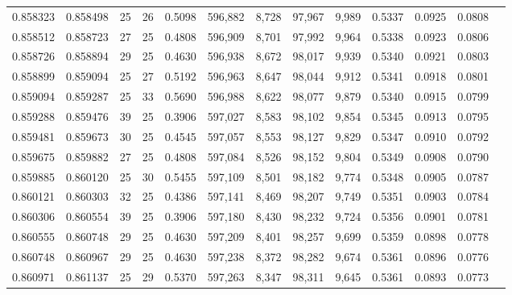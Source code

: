 \begin{tabular}{rrrrrrrrrrrrr}
0.858323 & 0.858498 &    25 &  26 &                                     0.5098 & 596,882 &   8,728 &  97,967 &   9,989 & 0.5337 & 0.0925 & 0.0808 \\
0.858512 & 0.858723 &    27 &  25 &                                     0.4808 & 596,909 &   8,701 &  97,992 &   9,964 & 0.5338 & 0.0923 & 0.0806 \\
0.858726 & 0.858894 &    29 &  25 &                                     0.4630 & 596,938 &   8,672 &  98,017 &   9,939 & 0.5340 & 0.0921 & 0.0803 \\
0.858899 & 0.859094 &    25 &  27 &                                     0.5192 & 596,963 &   8,647 &  98,044 &   9,912 & 0.5341 & 0.0918 & 0.0801 \\
0.859094 & 0.859287 &    25 &  33 &                                     0.5690 & 596,988 &   8,622 &  98,077 &   9,879 & 0.5340 & 0.0915 & 0.0799 \\
0.859288 & 0.859476 &    39 &  25 &                                     0.3906 & 597,027 &   8,583 &  98,102 &   9,854 & 0.5345 & 0.0913 & 0.0795 \\
0.859481 & 0.859673 &    30 &  25 &                                     0.4545 & 597,057 &   8,553 &  98,127 &   9,829 & 0.5347 & 0.0910 & 0.0792 \\
0.859675 & 0.859882 &    27 &  25 &                                     0.4808 & 597,084 &   8,526 &  98,152 &   9,804 & 0.5349 & 0.0908 & 0.0790 \\
0.859885 & 0.860120 &    25 &  30 &                                     0.5455 & 597,109 &   8,501 &  98,182 &   9,774 & 0.5348 & 0.0905 & 0.0787 \\
0.860121 & 0.860303 &    32 &  25 &                                     0.4386 & 597,141 &   8,469 &  98,207 &   9,749 & 0.5351 & 0.0903 & 0.0784 \\
0.860306 & 0.860554 &    39 &  25 &                                     0.3906 & 597,180 &   8,430 &  98,232 &   9,724 & 0.5356 & 0.0901 & 0.0781 \\
0.860555 & 0.860748 &    29 &  25 &                                     0.4630 & 597,209 &   8,401 &  98,257 &   9,699 & 0.5359 & 0.0898 & 0.0778 \\
0.860748 & 0.860967 &    29 &  25 &                                     0.4630 & 597,238 &   8,372 &  98,282 &   9,674 & 0.5361 & 0.0896 & 0.0776 \\
0.860971 & 0.861137 &    25 &  29 &                                     0.5370 & 597,263 &   8,347 &  98,311 &   9,645 & 0.5361 & 0.0893 & 0.0773 \\

\end{tabular}
